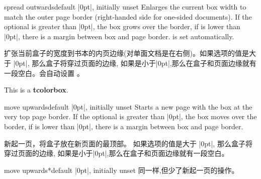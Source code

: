 \begin{docTcbKey}[][doc new=2017-02-13]{spread outwards}{}{default |0pt|, initially unset}
Enlarges the current box width to match the outer page border (right-handed side for one-sided
documents). If the optional  is greater than |0pt|, the box
grows over the border, if  is lower than |0pt|, there is a
margin between box and page border.
 is set automatically.

扩张当前盒子的宽度到书本的内页边缘(对单面文档是在右侧)。如果选项的值是大于 |0pt|, 那么盒子将穿过页面的边缘, 如果是小于|0pt|,那么在盒子和页面边缘就有一段空白。会自动设置  。

\begin{dispListing}
\begin{tcolorbox}[enhanced,spread outwards,
colframe=blue!75!black,colback=white,show bounding box]
This is a \textbf{tcolorbox}.
\end{tcolorbox}
\end{dispListing}
{\tcbusetemp}
\end{docTcbKey}


\begin{docTcbKey}[][doc new=2017-02-13]{move upwards}{}{default |0pt|, initially unset}
Starts a new page with the box at the very top page border.
If the optional  is greater than |0pt|, the box
moves over the border, if  is lower than |0pt|, there is a
margin between box and page border.

新起一页，将盒子放在新页面的最顶部。%
如果选项的值是大于 |0pt|, 那么盒子将穿过页面的边缘, 如果是小于|0pt|,那么在盒子和页面边缘就有一段空白。
\end{docTcbKey}


\begin{docTcbKey}[][doc new=2017-02-13]{move upwards*}{}{default |0pt|, initially unset}
同一样,但少了新起一页的操作。
\end{docTcbKey}




